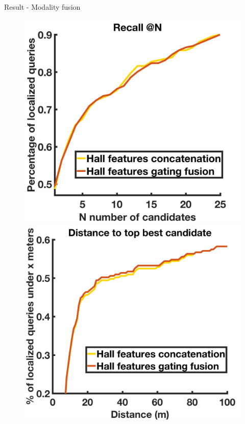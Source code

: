 \begin{frame}{Result - Modality fusion}
	\begin{figure}[t]
		\centering
		\includegraphics[width=0.499\linewidth]{images/gate_res/recall.jpg}\hfill
		\includegraphics[width=0.499\linewidth]{images/gate_res/dist.jpg}			
	\end{figure}	
\end{frame}